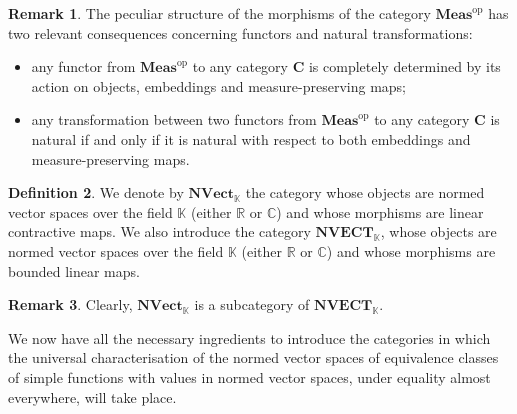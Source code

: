 \documentclass{amsart}
\theoremstyle{definition}
\newtheorem{definition}{Definition}[section]
\newtheorem{remark}[definition]{Remark}
\theoremstyle{plain}
\newcommand{\K}{\mathbb{K}}
\newcommand{\R}{\mathbb{R}}
\newcommand{\C}{\mathbb{C}}
\newcommand{\opMeas}{\mathbf{Meas}^\mathrm{op}}
\newcommand{\NVect}{\mathbf{NVect}_{\mathbb{K}}}
\newcommand{\NVECT}{\mathbf{NVECT}_{\mathbb{K}}}
\begin{document}
\begin{remark}
            The peculiar structure of the morphisms of the category $\opMeas$ has two relevant consequences concerning functors and natural transformations:
            \begin{itemize}
                \item[(i)] any functor from $\opMeas$ to any category $\mathbf{C}$ is completely determined by its action on objects, embeddings and measure-preserving maps;
                \item[(ii)] any transformation between two functors from $\opMeas$ to any category $\mathbf{C}$ is natural if and only if it is natural with respect to both embeddings and measure-preserving maps. 
            \end{itemize}
        \end{remark}

        \begin{definition}
            We denote by $\NVect$ the category whose objects are normed vector spaces over the field $\K$ (either $\R$ or $\C$) and whose morphisms are linear contractive maps.
            We also introduce the category $\NVECT$, whose objects are normed vector spaces over the field $\K$ (either $\R$ or $\C$) and whose morphisms are bounded linear maps.
        \end{definition}

        \begin{remark}
            Clearly, $\NVect$ is a subcategory of $\NVECT$.   
        \end{remark}

        We now have all the necessary ingredients to introduce the categories in which the universal characterisation of the normed vector spaces of equivalence classes of simple functions with values in normed vector spaces, under equality almost everywhere, will take place.
\end{document}
